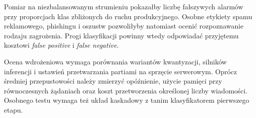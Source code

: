 Pomiar na niezbalansowanym strumieniu pokazałby liczbę fałszywych alarmów przy
proporcjach klas zbliżonych do ruchu produkcyjnego. Osobne etykiety spamu
reklamowego, phishingu i oszustw pozwoliłyby natomiast ocenić rozpoznawanie
rodzaju zagrożenia. Progi klasyfikacji powinny wtedy odpowiadać przyjętemu
kosztowi \emph{false positive} i \emph{false negative}.

Ocena wdrożeniowa wymaga porównania wariantów kwantyzacji, silników inferencji
i ustawień przetwarzania partiami na sprzęcie serwerowym. Oprócz średniej
przepustowości należy zmierzyć opóźnienie, użycie pamięci przy równoczesnych
żądaniach oraz koszt przetworzenia określonej liczby wiadomości. Osobnego testu
wymaga też układ kaskadowy z tanim klasyfikatorem pierwszego etapu.
